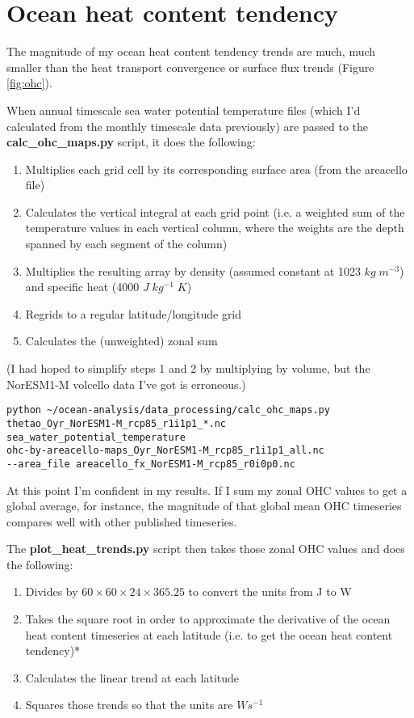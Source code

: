 \section{Ocean heat content tendency}

The magnitude of my ocean heat content tendency trends are much, much smaller than the heat transport convergence or surface flux trends (Figure \ref{fig:ohc}). 

When annual timescale sea water potential temperature files (which I'd calculated from the monthly timescale data previously) are passed to the \textbf{calc_ohc_maps.py} script, it does the following:
\begin{enumerate}
\item Multiplies each grid cell by its corresponding surface area (from the areacello file)
\item Calculates the vertical integral at each grid point (i.e. a weighted sum of the temperature values in each vertical column, where the weights are the depth spanned by each segment of the column)
\item Multiplies the resulting array by density (assumed constant at 1023 $kg\; m^{-3}$) and specific heat (4000 $J\; kg^{-1}\; K$)
\item Regrids to a regular latitude/longitude grid
\item Calculates the (unweighted) zonal sum
\end{enumerate}

(I had hoped to simplify steps 1 and 2 by multiplying by volume, but the NorESM1-M volcello data I've got is erroneous.) 

\begin{verbatim}
python ~/ocean-analysis/data_processing/calc_ohc_maps.py 
thetao_Oyr_NorESM1-M_rcp85_r1i1p1_*.nc 
sea_water_potential_temperature 
ohc-by-areacello-maps_Oyr_NorESM1-M_rcp85_r1i1p1_all.nc 
--area_file areacello_fx_NorESM1-M_rcp85_r0i0p0.nc
\end{verbatim}

At this point I'm confident in my results. If I sum my zonal OHC values to get a global average, for instance, the magnitude of that global mean OHC timeseries compares well with other published timeseries.

The \textbf{plot_heat_trends.py} script then takes those zonal OHC values and does the following:
\begin{enumerate}
\item Divides by $60 \times 60 \times 24 \times 365.25$ to convert the units from J to W
\item Takes the square root in order to approximate the derivative of the ocean heat content timeseries at each latitude (i.e. to get the ocean heat content tendency)*
\item Calculates the linear trend at each latitude
\item Squares those trends so that the units are $W s^{-1}$
\end{enumerate}

